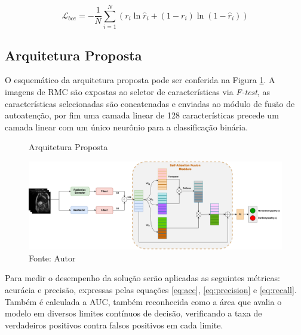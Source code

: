 \begin{equation}
\mathcal{L}_{bce} = -\frac{1}{N} \sum_{i=1}^N
(r_i \ln \hat{r}_i + (1 - r_i) \ln (1 - \hat{r}_i))
\label{eq:bce}
\end{equation}

\subsection{Arquitetura Proposta}
\label{subsec:cap4_arquitetura_proposta}

O esquemático da arquitetura proposta pode ser conferida na Figura \ref{fig:fig011}. A imagens de \gls{RMC} são expostas ao seletor de características via \textit{F-test}, as características selecionadas são concatenadas e enviadas ao módulo de fusão de autoatenção, por fim uma camada linear de 128 características precede um camada linear com um único neurônio para a classificação binária.


\begin{figure}[htbp]
    \centering
    \caption{Arquitetura Proposta}
    \includegraphics[width=1\textwidth]{figures/fig011.png}
    \caption*{Fonte: Autor}
    \label{fig:fig011}
\end{figure}

Para medir o desempenho da solução serão aplicadas as seguintes métricas: acurácia e precisão, expressas pelas equações \ref{eq:acc}, \ref{eq:precision} e \ref{eq:recall}.
Também é calculada a \gls{AUC}, também reconhecida como a área que avalia o modelo em diversos limites contínuos de decisão, verificando a taxa de verdadeiros positivos contra falsos positivos em cada limite.


